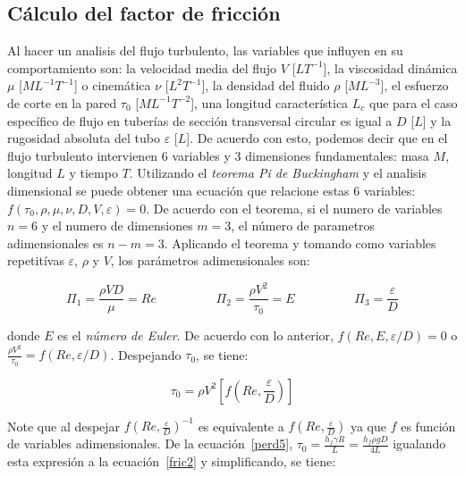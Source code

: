 \documentclass[11pt, oneside]{article}
\begin{document}
\subsection{C\'alculo del factor de fricci\'on} %
Al hacer un analisis del flujo turbulento, las variables que influyen en su comportamiento son: la velocidad media del flujo $V$ [$L T^{-1}$], la viscosidad din\'amica  $\mu$ [$ML^{-1} T^{-1}$] o cinem\'atica $\nu$ [$L^{2} T^{-1}$], la densidad del fluido $\rho$ [$M L^{-3}$], el esfuerzo de corte en la pared $\tau_0$ [$ML^{-1} T^{-2}$], una longitud caracter\'istica $L_c$ que para el caso espec\'ifico de flujo en tuber\'ias de secci\'on transversal circular es igual a $D$ [$L$] y la rugosidad absoluta del tubo $\varepsilon$ [$L$]. De acuerdo con esto, podemos decir que en el flujo turbulento intervienen 6 variables y 3 dimensiones fundamentales: masa $M$, longitud $L$ y tiempo $T$. Utilizando el \emph{teorema Pi de Buckingham} y el analisis dimensional se puede obtener una ecuaci\'on que relacione estas 6 variables: $f(\tau_0, \rho, \mu, \nu, D, V, \varepsilon)=0$. De acuerdo con el teorema, si el numero de variables $n=6$ y el numero de dimensiones $m=3$, el n\'umero de parametros adimensionales es $n-m=3$. Aplicando el teorema y tomando como variables repetit\'ivas $\varepsilon$, $\rho$ y $V$,  los par\'ametros adimensionales son: 

\begin{equation}
\Pi_1 = \frac{\rho V D}{\mu} = Re \hspace{2cm}  \Pi_2 = \frac{\rho V^2}{\tau_0} = E \hspace{2cm} \Pi_3 = \frac{\varepsilon}{D} 
\label{fric1}
\end{equation}

donde $E$ es el \emph{n\'umero de Euler}. De acuerdo con lo anterior, $f(Re, E, \varepsilon/D)=0$ o  $\frac{\rho V^2}{\tau_0} = f(Re,\varepsilon/D)$. Despejando $\tau_0$, se tiene:

\begin{equation}
\tau_0 = \rho V^2 \left[ f \left(Re , \frac{\varepsilon}{D} \right) \right]
\label{fric2}
\end{equation}

Note que al despejar $ f \left(Re , \frac{\varepsilon}{D}\right)^{-1}$ es equivalente a $f \left(Re , \frac{\varepsilon}{D}\right)$ ya que $f$ es funci\'on de variables adimensionales. De la ecuaci\'on~\ref{perd5},  $\tau_0 = \frac{h_f \gamma R}{L} = \frac{h_f \rho g D}{4L}$ igualando esta expresi\'on a la ecuaci\'on~\ref{fric2} y simplificando, se tiene:
\end{document}
